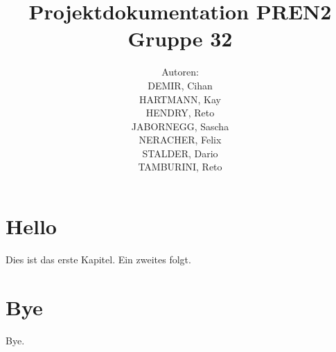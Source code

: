 \documentclass[11pt,german]{article}
\author{	Autoren:\\
			DEMIR, Cihan\\
			HARTMANN, Kay\\
			HENDRY, Reto\\
			JABORNEGG, Sascha\\
			NERACHER, Felix\\			
			STALDER, Dario\\
			TAMBURINI, Reto\\
		}
\title{Projektdokumentation PREN2\\Gruppe 32}
\begin{document}
  \maketitle
  \tableofcontents
	\newpage	
  \section{Hello}
  Dies ist das erste Kapitel.
  Ein zweites folgt.
  \section{Bye}
  Bye.
\end{document}
